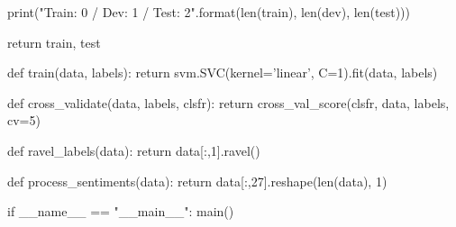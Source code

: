 \documentclass{article} %
\begin{document}
\begin{python}
  print("Train: {0} / Dev: {1} / Test: {2}".format(len(train), len(dev), len(test)))

  return train, test

def train(data, labels):
  return svm.SVC(kernel='linear', C=1).fit(data, labels)

def cross_validate(data, labels, clsfr):
  return cross_val_score(clsfr, data, labels, cv=5)

def ravel_labels(data):
  return data[:,1].ravel()

def process_sentiments(data):
  return data[:,27].reshape(len(data), 1)

if __name__ == "__main__":
  main()
\end{python}
\end{document}
